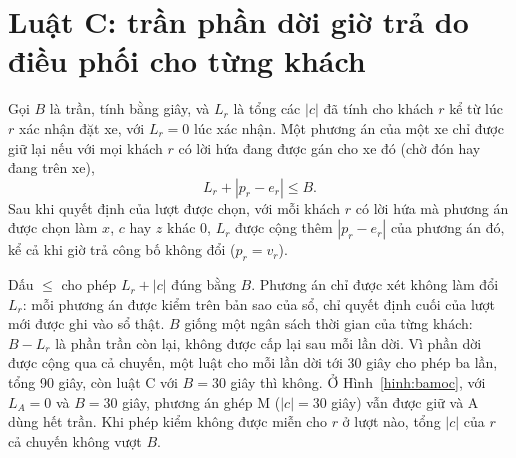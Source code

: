\section{Luật C: trần phần dời giờ trả do điều phối cho từng khách}
\label{muc:luatc}

\begin{dinhnghia}[Luật C]
\label{dn:luatc}
Gọi $B$ là trần, tính bằng giây, và $L_r$ là tổng các $|c|$ đã tính cho khách $r$ kể từ lúc $r$ xác nhận đặt xe,
với $L_r = 0$ lúc xác nhận. Một phương án của một xe chỉ được giữ lại nếu với mọi khách $r$ có lời hứa đang được
gán cho xe đó (chờ đón hay đang trên xe),
\begin{equation}
L_r + |p_r - e_r| \le B .
\label{eq:luatc}
\end{equation}
Sau khi quyết định của lượt được chọn, với mỗi khách $r$ có lời hứa mà phương án được chọn làm $x$, $c$ hay $z$
khác 0, $L_r$ được cộng thêm $|p_r - e_r|$ của phương án đó, kể cả khi giờ trả công bố không đổi ($p_r = v_r$).
\end{dinhnghia}

Dấu $\le$ cho phép $L_r + |c|$ đúng bằng $B$. Phương án chỉ được xét không làm đổi $L_r$: mỗi phương án được
kiểm trên bản sao của sổ, chỉ quyết định cuối của lượt mới được ghi vào sổ thật. $B$ giống một ngân sách thời
gian của từng khách: $B - L_r$ là phần trần còn lại, không được cấp lại sau mỗi lần dời. Vì phần dời được cộng
qua cả chuyến, một luật cho mỗi lần dời tới 30 giây cho phép ba lần, tổng 90 giây, còn luật C với $B = 30$ giây thì
không. Ở Hình~\ref{hinh:bamoc}, với $L_A = 0$ và $B = 30$ giây, phương án ghép M ($|c| = 30$ giây) vẫn được giữ và
A dùng hết trần. Khi phép kiểm không được miễn cho $r$ ở lượt nào, tổng $|c|$ của $r$ cả chuyến không vượt $B$.

